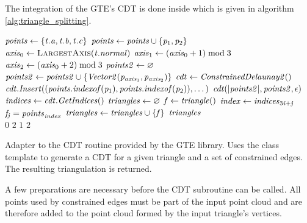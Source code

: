 The integration of the GTE's CDT is done inside  which is given in algorithm \ref{alg:triangle_splitting}.
%
\begin{algorithm}
	\centering
	\begin{algorithmic}[1]
			\State $\mathit{points} \gets \{\mathit{t}.\mathit{a}, \mathit{t}.\mathit{b}, \mathit{t}.\mathit{c}\}$ 
				\State $\mathit{points} \gets \mathit{points} \cup \{\mathit{p}_1, \mathit{p}_2\}$
			\EndFor
			\State $\var{axis}_0 \gets \Call{LargestAxis}{\var{t}.\var{normal}}$
			\State $\mathit{axis}_1 \gets (\mathit{axis}_0 + 1) \bmod 3$ 
			\State $\mathit{axis}_2 \gets (\mathit{axis}_0 + 2) \bmod 3$
			\State $\mathit{points2} \gets \varnothing$ 
				\State $\mathit{points2} \gets \mathit{points2} \cup \{\mathit{Vector2}(\mathit{p}_{\mathit{axis}_1}, \mathit{p}_{\mathit{axis}_2})\}$
			\EndFor
			\State $\mathit{cdt} \gets \mathit{ConstrainedDelaunay2()}$
			 
				\State $\mathit{cdt}.\mathit{Insert}((\mathit{points}.\mathit{indexof}(\mathit{p}_1), \mathit{points}.\mathit{indexof}(\mathit{p}_2)), \dots)$
			\EndFor
			\State $\mathit{cdt}(|\mathit{points2}|, \mathit{points2}, \epsilon)$ 
			\State $\mathit{indices} \gets \mathit{cdt}.\mathit{GetIndices}()$
			\State $\mathit{triangles} \gets \varnothing$
				\State $\mathit{f} \gets \mathit{triangle()}$
					\State $\mathit{index} \gets \mathit{indices}_{3\mathit{i} + \mathit{j}}$
					\State $\mathit{f}_{\mathit{j}} = \mathit{points}_{\mathit{index}}$
				\EndFor
				\State $\mathit{triangles} \gets \mathit{triangles} \cup \{\mathit{f}\}$
			\EndFor
			\State \Return $\mathit{triangles}$
		\EndFunction
		\\
					\State \Return $0$
				\Else
					\State \Return $2$
				\EndIf
			\Else 
					\State \Return $1$
				\Else
					\State \Return $2$
				\EndIf
			\EndIf
		\EndFunction
	\end{algorithmic}
	\caption{
		Adapter to the CDT routine provided by the GTE library.
		Uses the  class template to generate a CDT for a given triangle and a set of constrained edges.
		The resulting triangulation is returned.
	}
	\label{alg:triangle_splitting}
\end{algorithm}
%
A few preparations are necessary before the CDT subroutine can be called.
All points used by constrained edges must be part of the input point cloud and are therefore added to the point cloud formed by the input triangle's vertices.

